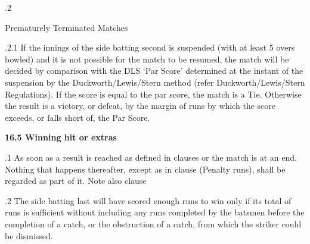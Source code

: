 \documentclass[12pt]{article}
\begin{document}
\vspace{\baselineskip}
{\fontsize{9pt}{10.8pt}.2 \tabto{0.49in} {\fontsize{8pt}{9.6pt}\selectfont Prematurely Terminated Matches\par}\par}\par


\vspace{\baselineskip}
\begin{adjustwidth}{1.18in}{0.06in}
{\fontsize{9pt}{10.8pt}.2.1 \tabto{1.17in} If the innings of the side batting second is suspended (with at least 5 overs bowled) and it is not possible for the match to be resumed, the match will be decided by comparison with the DLS ‘Par Score’ determined at the instant of the suspension by the Duckworth/Lewis/Stern method (refer Duckworth/Lewis/Stern Regulations). If the score is equal to the par score, the match is a Tie. Otherwise the result is a victory, or defeat, by the margin of runs by which the score exceeds, or falls short of, the Par Score.\par}\par

\end{adjustwidth}


\vspace{\baselineskip}
{\fontsize{11pt}{13.2pt}\selectfont \textbf{16.5 \tabto{0.47in} Winning hit or extras}\par}\par


\vspace{\baselineskip}
\begin{adjustwidth}{0.5in}{0.03in}
{\fontsize{9pt}{10.8pt}.1 \tabto{0.49in} As soon as a result is reached as defined in clauses or the match is at an end. Nothing that happens thereafter, except as in clause (Penalty runs), shall be regarded as part of it. Note also clause \par}\par

\end{adjustwidth}


\vspace{\baselineskip}
\begin{adjustwidth}{0.5in}{0.04in}
{\fontsize{9pt}{10.8pt}.2 \tabto{0.49in} The side batting last will have scored enough runs to win only if its total of runs is sufficient without including any runs completed by the batsmen before the completion of a catch, or the obstruction of a catch, from which the striker could be dismissed.\par}\par

\end{adjustwidth}
\end{document}
